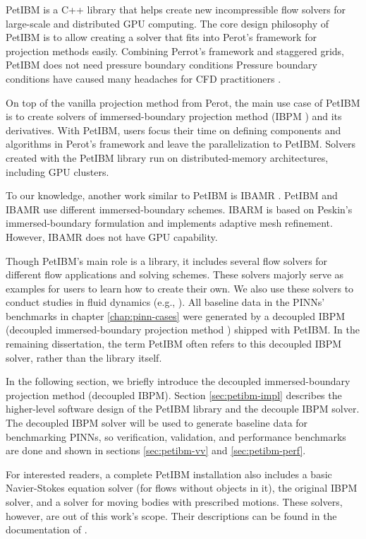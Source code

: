 PetIBM is a C++ library that helps create new incompressible flow solvers for large-scale and distributed GPU computing.
The core design philosophy of PetIBM is to allow creating a solver that fits into Perot's framework \cite{perot_analysis_1993} for projection methods easily.
Combining Perrot's framework and staggered grids, PetIBM does not need pressure boundary conditions
Pressure boundary conditions have caused many headaches for CFD practitioners \cite{gresho_pressure_1987,sani_resume_1994}.

On top of the vanilla projection method from Perot, the main use case of PetIBM is to create solvers of immersed-boundary projection method (IBPM \cite{taira_immersed_2007}) and its derivatives.
With PetIBM, users focus their time on defining components and algorithms in Perot's framework and leave the parallelization to PetIBM.
Solvers created with the PetIBM library run on distributed-memory architectures, including GPU clusters.

To our knowledge, another work similar to PetIBM is IBAMR \cite{griffith_adaptive_2007,bhalla_unified_2013}. 
PetIBM and IBAMR use different immersed-boundary schemes.
IBARM is based on Peskin's immersed-boundary formulation \cite{Peskin2002} and implements adaptive mesh refinement.
However, IBAMR does not have GPU capability.

Though PetIBM's main role is a library, it includes several flow solvers for different flow applications and solving schemes.
These solvers majorly serve as examples for users to learn how to create their own.
We also use these solvers to conduct studies in fluid dynamics (e.g., \cite{mesnard_reproducible_2017}).
All baseline data in the PINNs' benchmarks in chapter \ref{chap:pinn-cases} were generated by a decoupled IBPM (decoupled immersed-boundary projection method \cite{li_efficient_2016}) shipped with PetIBM.
In the remaining dissertation, the term PetIBM often refers to this decoupled IBPM solver, rather than the library itself.

In the following section, we briefly introduce the decoupled immersed-boundary projection method (decoupled IBPM).
Section \ref{sec:petibm-impl} describes the higher-level software design of the PetIBM library and the decouple IBPM solver.
The decoupled IBPM solver will be used to generate baseline data for benchmarking PINNs, so verification, validation, and performance benchmarks are done and shown in sections \ref{sec:petibm-vv} and \ref{sec:petibm-perf}.

For interested readers, a complete PetIBM installation also includes a basic Navier-Stokes equation solver (for flows without objects in it), the original IBPM solver, and a solver for moving bodies with prescribed motions.
These solvers, however, are out of this work's scope.
Their descriptions can be found in the documentation of \cite{chuang_petibm:_2018}.
